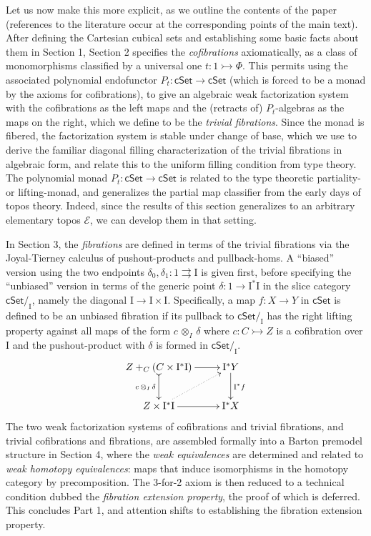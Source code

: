 \documentclass[11pt,reqno]{amsart}
\newcommand{\EE}{\ensuremath{\mathcal{E}}}
\newcommand{\cSet}{\ensuremath{\mathsf{cSet}}}
\newcommand{\slice}[1]{\ensuremath{/_{\!{#1}}}}
\newcommand{\mono}{\ensuremath{\rightarrowtail}}
\newcommand{\cof}{\ensuremath{\rightarrowtail}}
\renewcommand{\to}{\ensuremath{\rightarrow}}
\newcommand{\I}{\ensuremath{\mathrm{I}}}
\theoremstyle{remark}
\theoremstyle{definition}
\begin{document}
Let us now make this more explicit, as we outline the contents of the paper (references to the literature occur at the corresponding points of the main text).
After defining the Cartesian cubical sets and establishing some basic facts about them in Section 1, Section 2  specifies the \emph{cofibrations} axiomatically, as a class of monomorphisms classified by a universal one $t:1 \cof \Phi$.  This permits using the associated polynomial endofunctor $P_t : \cSet\to \cSet$ (which is forced to be a monad by the axioms for cofibrations), to give an algebraic weak factorization system with the cofibrations as the left maps and the (retracts of) $P_t$-algebras as the maps on the right, which we define to be the \emph{trivial fibrations}.  Since the monad is fibered, the factorization system is stable under change of base, which we use to derive the familiar diagonal filling characterization of the trivial fibrations in algebraic form, and relate this to the uniform filling condition from type theory.  The polynomial monad $P_t : \cSet\to \cSet$ is related to the type theoretic partiality- or lifting-monad, and generalizes the partial map classifier from the early days of topos theory.  Indeed, since the results of this section generalizes to an arbitrary elementary topos \EE, we can develop them in that setting. 

In Section 3, the \emph{fibrations} are defined in terms of the trivial fibrations via the Joyal-Tierney calculus of pushout-products and pullback-homs.  A ``biased'' version using the two endpoints $\delta_0, \delta_1: 1\rightrightarrows\I$ is given first, before specifying the ``unbiased''  version in terms of the generic point $\delta : 1 \to \I^*\I$  in the slice category $\cSet\slice{\I}$, namely the diagonal $\I \to \I\times\I$.  Specifically, a map $f : X \to Y$ in $\cSet$ is defined to be an unbiased fibration if its pullback to $\cSet\slice{\I}$ has the right lifting property against all maps of the form $c\, \otimes_I\, \delta$ where $c : C\mono Z$ is a cofibration over $\I$ and the pushout-product with $\delta$ is formed in $\cSet\slice{\I}$. 
\begin{equation*}\label{diagram:unbiasedfibrationIntro}
\xymatrix{
Z +_C (C\times\I^*\I) \ar@{>->}[d]_{c\, \otimes_I\, \delta} \ar[r] & \I^*Y \ar[d]^{\I^*f} \\
Z\times \I^*\I \ar@{.>}[ru] \ar[r] & \I^*X
}
\end{equation*}
%
The two weak factorization systems of cofibrations and trivial fibrations, and trivial cofibrations and fibrations, are assembled formally into a Barton premodel structure in Section 4, where the \emph{weak equivalences} are determined and related to \emph{weak homotopy equivalences}:  maps that induce isomorphisms in the homotopy category by precomposition.  The 3-for-2 axiom is then reduced to a technical condition dubbed the \emph{fibration extension property}, the proof of which is deferred.  This concludes Part 1, and attention shifts to establishing the fibration extension property.
\end{document}
